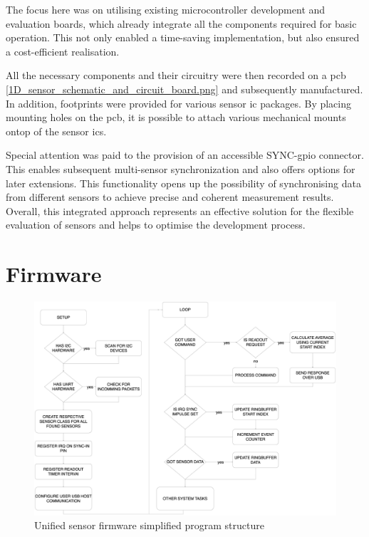 The focus here was on utilising existing microcontroller development and
evaluation boards, which already integrate all the components required
for basic operation. This not only enabled a time-saving implementation,
but also ensured a cost-efficient realisation.

All the necessary components and their circuitry were then recorded on a
\gls{pcb} \ref{1D_sensor_schematic_and_circuit_board.png} and
subsequently manufactured. In addition, footprints were provided for
various sensor \gls{ic} packages. By placing mounting holes on the
\gls{pcb}, it is possible to attach various mechanical mounts ontop of
the sensor \gls{ic}s.

Special attention was paid to the provision of an accessible
SYNC-\gls{gpio} connector. This enables subsequent multi-sensor
synchronization and also offers options for later extensions. This
functionality opens up the possibility of synchronising data from
different sensors to achieve precise and coherent measurement results.
Overall, this integrated approach represents an effective solution for
the flexible evaluation of sensors and helps to optimise the development
process.

\hypertarget{firmware}{%
\section{Firmware}\label{firmware}}

\begin{figure}
\centering
\includegraphics{./generated_images/border_Unified_sensor_firmware_simplified_program_structure.png}
\caption{Unified sensor firmware simplified program structure
\label{Unified_sensor_firmware_simplified_program_structure.png}}
\end{figure}


